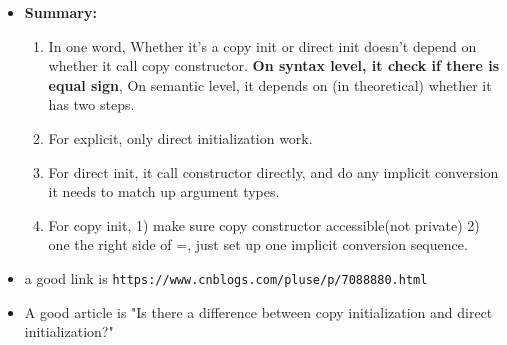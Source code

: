 \documentclass[a4paper,11pt,twoside]{book}
\begin{document}
\begin{itemize}
\item \textbf{Summary:}
\begin{enumerate}
	\item In one word, Whether it's a copy init or direct init doesn't depend on whether it call copy constructor. \textbf{On syntax level, it check if there is equal sign}, On semantic level,  it depends on (in theoretical) whether it has two steps.
	
	\item For explicit, only direct initialization work.  
	
	\item For direct init, it call constructor directly, and do any implicit conversion it needs to match up argument types.
	
	\item For copy init, 1) make sure copy constructor accessible(not private) 2) one the right side of =, just set up one implicit conversion sequence.
\end{enumerate}

		
\item a good link is \verb|https://www.cnblogs.com/pluse/p/7088880.html|
\item A good article is "Is there a difference between copy initialization and direct initialization?"

\end{itemize}
\end{document}
